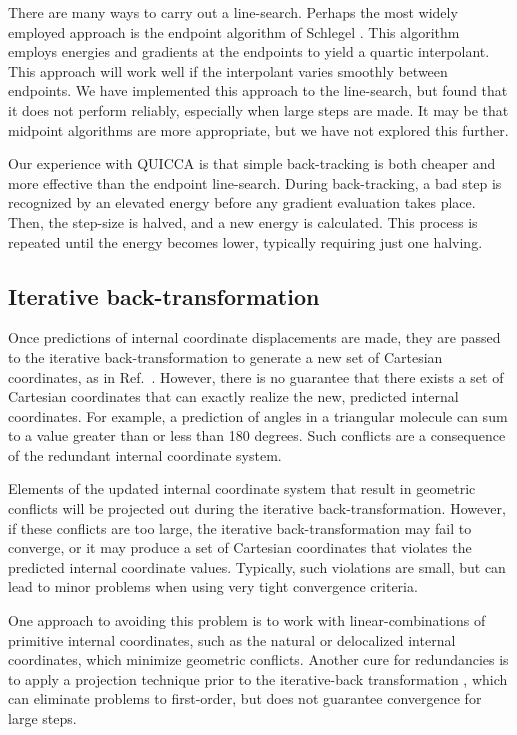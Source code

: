 \documentclass[prl,twocolumn,showpacs,twocolumngrid,superbib]{revtex4}
\begin{document}
There are many ways to carry out a line-search.  Perhaps the most widely employed 
approach is the endpoint algorithm of Schlegel \cite{sclegel_linesearch}.  This algorithm
employs energies and gradients at the endpoints to yield a quartic interpolant.  This
approach will work well if the interpolant varies smoothly between endpoints.  We have
implemented this approach to the line-search, but found that it does not perform 
reliably, especially when large steps are made.   It may be that midpoint algorithms
are more appropriate, but we have not explored this further.

Our experience with QUICCA is that simple back-tracking is both cheaper and more effective
than the endpoint line-search.  During back-tracking, a  bad step is recognized by an elevated
energy before any gradient evaluation takes place. Then, the step-size is halved,
and a new energy is calculated.  This process is repeated until the energy becomes lower,
typically requiring just one halving.

\subsection{Iterative back-transformation}\label{transformation}

Once predictions of internal coordinate displacements are made, they are passed to the 
iterative back-transformation to generate a new set of Cartesian coordinates, as in 
Ref.~\cite{pulay_review}.   However, there is no guarantee that there exists a set of 
Cartesian coordinates that can exactly realize the new, predicted internal coordinates.  
For example, a prediction of angles in a triangular molecule can sum 
to a value greater than or less than 180 degrees. Such conflicts are a consequence of 
the redundant internal coordinate system.  

Elements of the updated internal coordinate system that result in geometric conflicts 
will be projected out during the iterative back-transformation. However, if 
these conflicts are too large, the iterative back-transformation may fail to converge,
or it may produce a set of Cartesian coordinates that violates the predicted internal 
coordinate values.   Typically, such violations are small, but can  lead to minor problems 
when using very tight convergence criteria.

One approach to avoiding this problem is to work with linear-combinations of primitive internal
coordinates, such as the natural \cite{Pulay_natural_internals} or delocalized
\cite{Baker_deloc_1} internal coordinates, which minimize geometric conflicts.  
Another cure for redundancies is to apply a projection technique prior to the iterative-back 
transformation \cite{pulay_review}, which can eliminate problems to first-order, but does not 
guarantee convergence for large steps.
\end{document}
